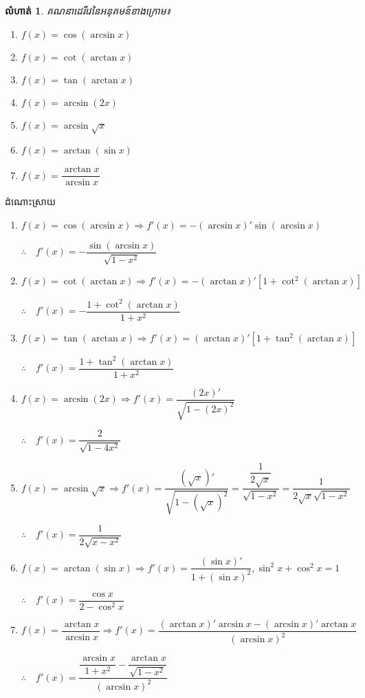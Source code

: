 \documentclass[12pt,fleqn]{book} %
\newtheorem{exercise}{\kml លំហាត់}
\newcommand{\answer}{\begin{center}
\kml \color{magenta} ដំណោះស្រាយ
\end{center}}
\begin{document}
\begin{exercise}
គណនាដេរីវេនៃអនុគមន៍ខាងក្រោម៖
\begin{multicols}{2}
\begin{enumerate}
\item $f(x)=\cos (\arcsin x)$
\item $f(x)=\cot (\arctan x)$
\item $f(x)=\tan (\arctan x)$
\item $f(x)=\arcsin (2x)$
\item $f(x)=\arcsin \sqrt{x}$
\item $f(x)=\arctan (\sin x)$
\item $f(x)=\dfrac{\arctan x}{\arcsin x}$
\end{enumerate}
\end{multicols}
\end{exercise}
\answer 
\begin{enumerate}
\item $f(x)=\cos (\arcsin x)\Longrightarrow f'(x)=-(\arcsin x)'\sin (\arcsin x)$
\begin{center}
$\therefore \quad f'(x)=-\dfrac{\sin (\arcsin x)}{\sqrt{1-x^2}}$
\end{center}
\item $f(x)=\cot (\arctan x)\Longrightarrow f'(x)=-(\arctan x)'[1+\cot^2 (\arctan x)]$
\begin{center}
$\therefore \quad f'(x)=-\dfrac{1+\cot^2 (\arctan x)}{1+x^2}$
\end{center}
\item $f(x)=\tan (\arctan x)\Longrightarrow f'(x)=(\arctan x)'[1+\tan^2 (\arctan x)]$
\begin{center}
$\therefore \quad f'(x)=\dfrac{1+\tan^2 (\arctan x)}{1+x^2}$
\end{center}
\item $f(x)=\arcsin (2x)\Longrightarrow f'(x)=\dfrac{(2x)'}{\sqrt{1-(2x)^2}}$
\begin{center}
$\therefore \quad f'(x)=\dfrac{2}{\sqrt{1-4x^2}}$
\end{center}
\item $f(x)=\arcsin \sqrt{x}\Longrightarrow f'(x)=\dfrac{(\sqrt{x})'}{\sqrt{1-(\sqrt{x})^2}}=\dfrac{\dfrac{1}{2\sqrt{x}}}{\sqrt{1-x^2}}=\dfrac{1}{2\sqrt{x}\sqrt{1-x^2}}$
\begin{center}
$\therefore \quad f'(x)=\dfrac{1}{2\sqrt{x-x^2}}$
\end{center}
\item $f(x)=\arctan (\sin x)\Longrightarrow f'(x)=\dfrac{(\sin x)'}{1+(\sin x)^2},\sin^2 x+\cos^2 x=1$
\begin{center}
$\therefore \quad f'(x)=\dfrac{\cos x}{2-\cos^2 x}$
\end{center}
\item $f(x)=\dfrac{\arctan x}{\arcsin x}\Longrightarrow f'(x)=\dfrac{(\arctan x)'\arcsin x-(\arcsin x)'\arctan x}{(\arcsin x)^2}$
\begin{center}
$\therefore \quad f'(x)=\dfrac{\dfrac{\arcsin x}{1+x^2}-\dfrac{\arctan x}{\sqrt{1-x^2}}}{(\arcsin x)^2}$
\end{center}
\end{enumerate}
\end{document}
